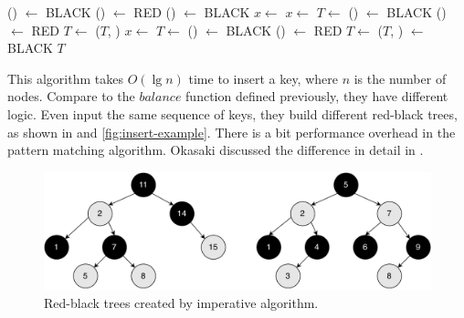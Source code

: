 \documentclass[b5paper]{article}
\begin{document}
\begin{algorithmic}[1]
      \State {}() $\gets$ BLACK
      \State {}() $\gets$ RED
      \State {}() $\gets$ BLACK
      \State $x \gets$ 
    \Else
          \State $x \gets$ 
          \State $T \gets$ 
        \EndIf
        \State {}() $\gets$ BLACK
        \State {}() $\gets$ RED
        \State $T \gets$ ($T$, )
      \Else
          \State $x \gets$ 
          \State $T \gets$ 
        \EndIf
        \State {}() $\gets$ BLACK
        \State {}() $\gets$ RED
        \State $T \gets$ ($T$, )
      \EndIf
    \EndIf
  \EndWhile
  \State {} $\gets$ BLACK
  \State \Return $T$
\EndFunction
\end{algorithmic}

This algorithm takes $O(\lg n)$ time to insert a key, where $n$ is the number of nodes. Compare to the $balance$ function defined previously, they have different logic. Even input the same sequence of keys, they build different red-black trees, as shown in  and \cref{fig:insert-example}. There is a bit performance overhead in the pattern matching algorithm. Okasaki discussed the difference in detail in \cite{okasaki}.

\begin{figure}[htbp]
   \centering
   \includegraphics[scale=0.5]{img/imperative-insert}
   \caption{Red-black trees created by imperative algorithm.}
   \label{fig:imperative-insert}
\end{figure}
\end{document}
